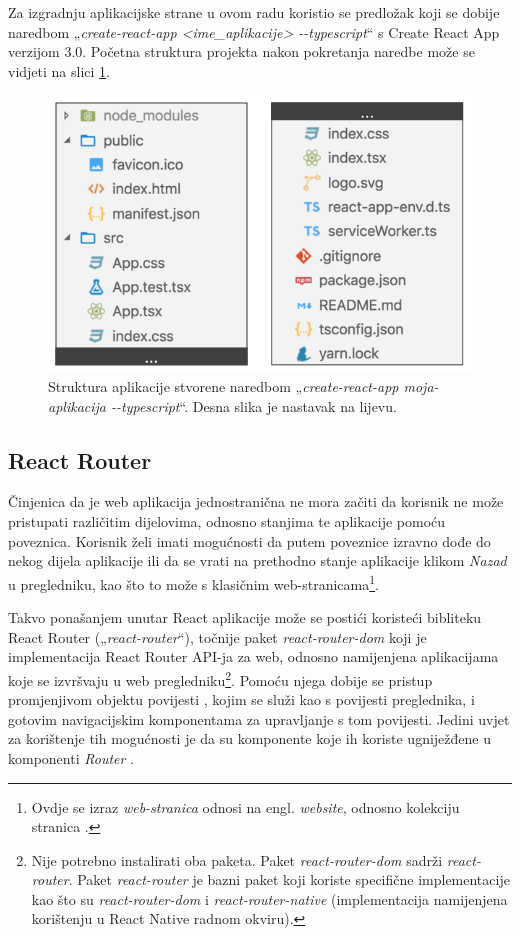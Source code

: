 \documentclass[times, utf8, diplomski, numeric]{fer}
\newcommand{\razmakp}{\vspace{18pt}}
\newcommand{\razmaks}{\vspace{10pt}}
\begin{document}
\razmakp

Za izgradnju aplikacijske strane u ovom radu koristio se predložak koji se dobije naredbom „\emph{create-react-app <ime\_aplikacije> -{}-typescript}“ s Create React App verzijom 3.0.
Početna struktura projekta nakon pokretanja naredbe može se vidjeti na slici \ref{fig:cra}.

\begin{figure}[!htb] %
    \centering
    \includegraphics[width=12cm]{images/cra.png}
    \caption{Struktura aplikacije stvorene naredbom „\emph{create-react-app moja-aplikacija -{}-typescript}“. Desna slika je nastavak na lijevu.}
    \label{fig:cra}
    \razmaks
\end{figure}


\razmaks
\subsection{React Router}

Činjenica da je web aplikacija jednostranična ne mora začiti da korisnik ne može pristupati različitim dijelovima, odnosno stanjima te aplikacije pomoću poveznica.
Korisnik želi imati mogućnosti da putem poveznice izravno dođe do nekog dijela aplikacije ili da se vrati na prethodno stanje aplikacije klikom \emph{Nazad} u pregledniku, kao što to može s klasičnim web-stranicama\footnote{Ovdje se izraz \emph{web-stranica} odnosi na engl. \emph{website}, odnosno kolekciju stranica .}.

Takvo ponašanjem unutar React aplikacije može se postići koristeći bibliteku React Router („\emph{react-router}“), točnije paket \emph{react-router-dom} koji je implementacija React Router API-ja za web, odnosno namijenjena aplikacijama koje se izvršvaju u web pregledniku\footnote{
    Nije potrebno instalirati oba paketa.
    Paket \emph{react-router-dom} sadrži \emph{react-router}.
    Paket \emph{react-router} je bazni paket koji koriste specifične implementacije kao što su \emph{react-router-dom} i \emph{react-router-native} (implementacija namijenjena korištenju u React Native radnom okviru).
}.
Pomoću njega dobije se pristup promjenjivom objektu povijesti , kojim se služi kao s povijesti preglednika, i gotovim navigacijskim komponentama za upravljanje s tom povijesti.
Jedini uvjet za korištenje tih mogućnosti je da su komponente koje ih koriste ugniježđene u komponenti \emph{Router} \citep{react_router}.
\end{document}
